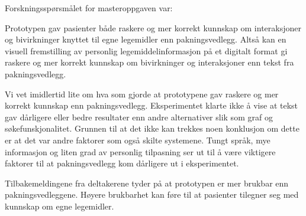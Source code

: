 Forskningsspørsmålet for masteroppgaven var: 
\thesisRQ

Prototypen gav pasienter både raskere og mer korrekt kunnskap om interaksjoner og bivirkninger knyttet til egne legemidler enn pakningsvedlegg. Altså kan en visuell fremstilling av personlig legemiddelinformasjon på et digitalt format gi raskere og mer korrekt kunnskap om bivirkninger og interaksjoner enn tekst fra pakningsvedlegg. 

Vi vet imidlertid lite om hva som gjorde at prototypene gav raskere og mer korrekt kunnskap enn pakningsvedlegg. Eksperimentet klarte ikke å vise at tekst gav dårligere eller bedre resultater enn andre alternativer slik som graf og søkefunskjonalitet. Grunnen til at det ikke kan trekkes noen konklusjon om dette er at det var andre faktorer som også skilte systemene. Tungt språk, mye informasjon og liten grad av personlig tilpasning ser ut til å være viktigere faktorer til at pakningsvedlegg kom dårligere ut i eksperimentet.

Tilbakemeldingene fra deltakerene tyder på at prototypen er mer brukbar enn pakningsvedleggene. Høyere brukbarhet kan føre til at pasienter tilegner seg med kunnskap om egne legemidler. 